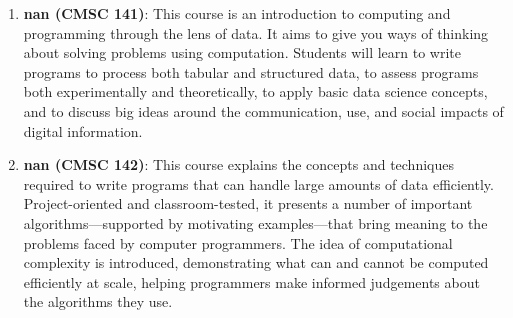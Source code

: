 \begin{enumerate}
\item \textbf{nan (CMSC 141)}: This course is an introduction to computing and programming through the lens of data. It aims to give you ways of thinking about solving problems using computation. Students will learn to write programs to process both tabular and structured data, to assess programs both experimentally and theoretically, to apply basic data science concepts, and to discuss big ideas around the communication, use, and social impacts of digital information.
\item \textbf{nan (CMSC 142)}: This course explains the concepts and techniques required to write programs that can handle large amounts of data efficiently. Project-oriented and classroom-tested, it presents a number of important algorithms—supported by motivating examples—that bring meaning to the problems faced by computer programmers. The idea of computational complexity is introduced, demonstrating what can and cannot be computed efficiently at scale, helping programmers make informed judgements about the algorithms they use. 
\end{enumerate}